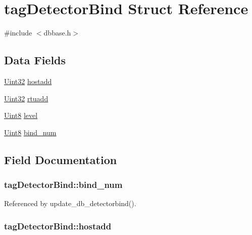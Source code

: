 \hypertarget{structtagDetectorBind}{\section{tag\-Detector\-Bind Struct Reference}
\label{structtagDetectorBind}
}


{\ttfamily \#include $<$dbbase.\-h$>$}

\subsection*{Data Fields}
\begin{DoxyCompactItemize}
\item 
\hyperlink{base_8h_a60cf7b3c038ce37a50796e8eaddf0b5f}{Uint32} \hyperlink{structtagDetectorBind_ae7cc7d68e9bf11aefc0459ab78956072}{hostadd}
\item 
\hyperlink{base_8h_a60cf7b3c038ce37a50796e8eaddf0b5f}{Uint32} \hyperlink{structtagDetectorBind_a19401ce86e9371f1130ed048d0bf085f}{rtuadd}
\item 
\hyperlink{base_8h_af84840501dec18061d18a68c162a8fa2}{Uint8} \hyperlink{structtagDetectorBind_a16b0c6c94a3ebfbbca084d64c6108eca}{level}
\item 
\hyperlink{base_8h_af84840501dec18061d18a68c162a8fa2}{Uint8} \hyperlink{structtagDetectorBind_a780b4ef8018a7973a58af19e787b5af5}{bind\-\_\-num}
\end{DoxyCompactItemize}


\subsection{Field Documentation}
\hypertarget{structtagDetectorBind_a780b4ef8018a7973a58af19e787b5af5}{
\subsubsection[{bind\-\_\-num}]{ tag\-Detector\-Bind\-::bind\-\_\-num}}\label{structtagDetectorBind_a780b4ef8018a7973a58af19e787b5af5}


Referenced by update\-\_\-db\-\_\-detectorbind().

\hypertarget{structtagDetectorBind_ae7cc7d68e9bf11aefc0459ab78956072}{
\subsubsection[{hostadd}]{ tag\-Detector\-Bind\-::hostadd}}\label{structtagDetectorBind_ae7cc7d68e9bf11aefc0459ab78956072}


